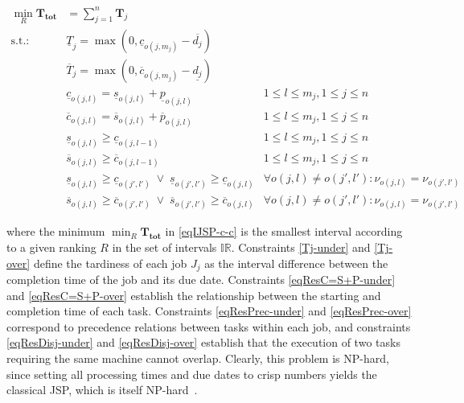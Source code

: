 \documentclass[12pt,halfline,a4paper]{ouparticle}
\begin{document}
\begin{align}\label{eqIJSP-c-c}
 \min_R \mathbf{T_{tot}} & = \sum_{j=1}^n \mathbf{T}_j & \\
\text{s.t.:} \quad %
		&  \underline{T}_j = \max(0,\underline{c}_{o(j,m_j)} - \overline{d_j}) & \label{Tj-under}\\
		&  \overline{T}_j = \max(0,\overline{c}_{o(j,m_j)} - \underline{d_j}) & \label{Tj-over}\\
        &  \underline{c}_{o(j,l)} = \underline{s}_{o(j,l)} + \underline{p}_{o(j,l)} & 1 \leq l \leq m_j, 1 \leq j \leq n \label{eqResC=S+P-under}\\
        &  \overline{c}_{o(j,l)} = \overline{s}_{o(j,l)} + \overline{p}_{o(j,l)} & 1 \leq l \leq m_j, 1 \leq j \leq n \label{eqResC=S+P-over}\\
        & \underline{s}_{o(j,l)} \geq \underline{c}_{o(j,l-1)} & 1 \leq l \leq m_j, 1 \leq j \leq n \label{eqResPrec-under}\\
        & \overline{s}_{o(j,l)} \geq \overline{c}_{o(j,l-1)} & 1 \leq l \leq m_j, 1 \leq j \leq n \label{eqResPrec-over}\\
       & \underline{s}_{o(j,l)} \geq \underline{c}_{o(j',l')} \; \vee \;  \underline{s}_{o(j',l')} \geq \underline{c}_{o(j,l)} &  \forall o(j,l) \neq o(j',l'): \nu_{o(j,l)}=\nu_{o(j',l')} \label{eqResDisj-under}\\
       & \overline{s}_{o(j,l)} \geq \overline{c}_{o(j',l')} \; \vee \;  \overline{s}_{o(j',l')} \geq \overline{c}_{o(j,l)} &  \forall o(j,l) \neq o(j',l'): \nu_{o(j,l)}=\nu_{o(j',l')}  \label{eqResDisj-over}
\end{align}


\noindent
where the minimum $\min_R \mathbf{T_{tot}}$ in \eqref{eqIJSP-c-c} is the smallest interval according to a given ranking $R$ in the set of intervals $\mathbb{IR}$. Constraints \eqref{Tj-under} and \eqref{Tj-over} define the tardiness of each job $J_j$ as the interval difference between the completion time of the job and its due date. Constraints \eqref{eqResC=S+P-under} and \eqref{eqResC=S+P-over} establish the relationship between the starting and completion time of each task. Constraints \eqref{eqResPrec-under} and \eqref{eqResPrec-over} correspond to precedence relations between tasks within each job, and constraints \eqref{eqResDisj-under} and \eqref{eqResDisj-over} establish that the execution of two tasks requiring the same machine cannot overlap. 
Clearly, this problem is NP-hard, since setting all processing times and due dates to crisp numbers yields the classical JSP, which is itself NP-hard~\cite{Pinedo2016}.
\end{document}
